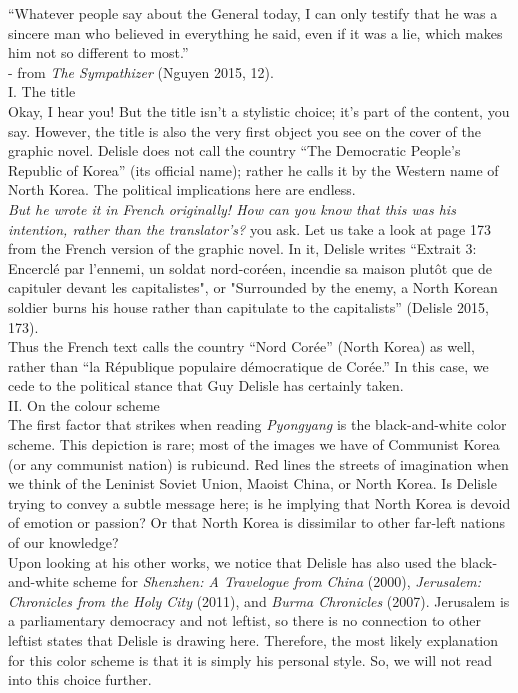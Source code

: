 \documentclass{article}
\begin{document}
“Whatever people say about the General today, I can only testify that he was a sincere man who believed in everything he said, even if it was a lie, which makes him not so different to most.” \\
- from \textit{The Sympathizer} (Nguyen 2015, 12). \\

I. The title \\

\newline \qquad Okay, I hear you! But the title isn’t a stylistic choice; it’s part of the content, you say. However, the title is also the very first object you see on the cover of the graphic novel. Delisle does not call the country “The Democratic People’s Republic of Korea” (its official name); rather he calls it by the Western name of North Korea. The political implications here are endless.\\ 

 \qquad \textit{But he wrote it in French originally! How can you know that this was his intention, rather than the translator’s?} you ask. Let us take a look at page 173 from the French version of the graphic novel. In it, Delisle writes “Extrait 3: Encerclé par l’ennemi, un soldat nord-coréen, incendie sa maison plutôt que de capituler devant les capitalistes", or "Surrounded by the enemy, a North Korean soldier burns his house rather than capitulate to the capitalists” (Delisle 2015, 173). \\

\qquad Thus the French text calls the country “Nord Corée” (North Korea) as well, rather than “la République populaire démocratique de Corée.” In this case, we cede to the political stance that Guy Delisle has certainly taken. \\

II. On the colour scheme \\

\qquad The first factor that strikes when reading \textit{Pyongyang} is the black-and-white color scheme. This depiction is rare; most of the images we have of Communist Korea (or any communist nation) is rubicund. Red lines the streets of imagination when we think of the Leninist Soviet Union, Maoist China, or North Korea. Is Delisle trying to convey a subtle message here; is he implying that North Korea is devoid of emotion or passion? Or that North Korea is dissimilar to other far-left nations of our knowledge? \\

\qquad Upon looking at his other works, we notice that Delisle has also used the black-and-white scheme for \textit{Shenzhen: A Travelogue from China} (2000), \textit{Jerusalem: Chronicles from the Holy City} (2011), and \textit{Burma Chronicles} (2007). Jerusalem is a parliamentary democracy and not leftist, so there is no connection to other leftist states that Delisle is drawing here. Therefore, the most likely explanation for this color scheme is that it is simply his personal style. So, we will not read into this choice further. \\
\end{document}
